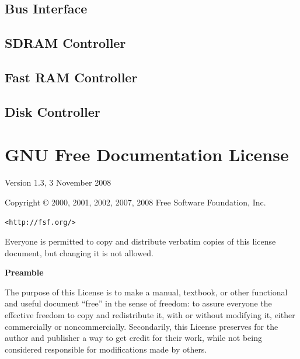 \documentclass[a4paper]{report}
\begin{document}
\newpage
\section{Bus Interface}
    

\newpage
\section{SDRAM Controller}
    

\newpage
\section{Fast RAM Controller}
    

\newpage
\section{Disk Controller}
    


\chapter{GNU Free Documentation License}

 \begin{center}

       Version 1.3, 3 November 2008


 Copyright \copyright{} 2000, 2001, 2002, 2007, 2008  Free Software Foundation, Inc.
 
 \bigskip
 
     \texttt{<http://fsf.org/>}
  
 \bigskip
 
 Everyone is permitted to copy and distribute verbatim copies
 of this license document, but changing it is not allowed.
\end{center}


\begin{center}
{\bf\large Preamble}
\end{center}

The purpose of this License is to make a manual, textbook, or other
functional and useful document ``free'' in the sense of freedom: to
assure everyone the effective freedom to copy and redistribute it,
with or without modifying it, either commercially or noncommercially.
Secondarily, this License preserves for the author and publisher a way
to get credit for their work, while not being considered responsible
for modifications made by others.
\end{document}
